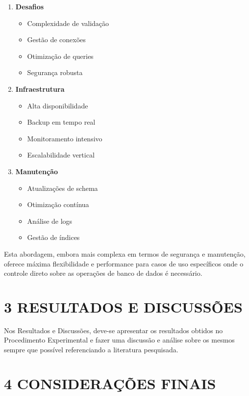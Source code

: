 \documentclass[
]{article}
\providecommand{\tightlist}{%
  \setlength{\itemsep}{0pt}\setlength{\parskip}{0pt}}
\begin{document}
\begin{enumerate}
\def\labelenumi{\arabic{enumi}.}
\tightlist
\item
  \textbf{Desafios}

  \begin{itemize}
  \tightlist
  \item
    Complexidade de validação
  \item
    Gestão de conexões
  \item
    Otimização de queries
  \item
    Segurança robusta
  \end{itemize}
\item
  \textbf{Infraestrutura}

  \begin{itemize}
  \tightlist
  \item
    Alta disponibilidade
  \item
    Backup em tempo real
  \item
    Monitoramento intensivo
  \item
    Escalabilidade vertical
  \end{itemize}
\item
  \textbf{Manutenção}

  \begin{itemize}
  \tightlist
  \item
    Atualizações de schema
  \item
    Otimização contínua
  \item
    Análise de logs
  \item
    Gestão de índices
  \end{itemize}
\end{enumerate}

Esta abordagem, embora mais complexa em termos de segurança e
manutenção, oferece máxima flexibilidade e performance para casos de uso
específicos onde o controle direto sobre as operações de banco de dados
é necessário.

\section{3 RESULTADOS E DISCUSSÕES}\label{resultados-e-discussuxf5es}

Nos Resultados e Discussões, deve-se apresentar os resultados obtidos no
Procedimento Experimental e fazer uma discussão e análise sobre os
mesmos sempre que possível referenciando a literatura pesquisada.

\section{4 CONSIDERAÇÕES FINAIS}\label{considerauxe7uxf5es-finais}
\end{document}
